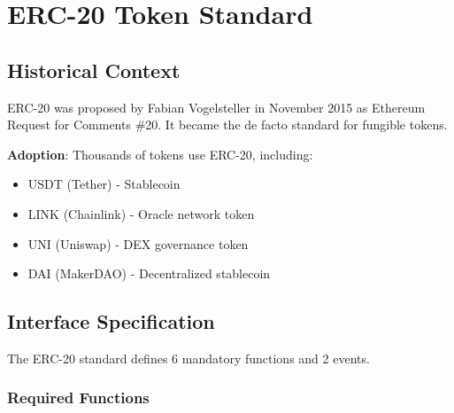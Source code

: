 \documentclass[11pt,a4paper]{article}
\begin{document}
\section{ERC-20 Token Standard}

\subsection{Historical Context}

ERC-20 was proposed by Fabian Vogelsteller in November 2015 as Ethereum Request for Comments \#20. It became the de facto standard for fungible tokens.

\textbf{Adoption}: Thousands of tokens use ERC-20, including:
\begin{itemize}
  \item USDT (Tether) - Stablecoin
  \item LINK (Chainlink) - Oracle network token
  \item UNI (Uniswap) - DEX governance token
  \item DAI (MakerDAO) - Decentralized stablecoin
\end{itemize}

\subsection{Interface Specification}

The ERC-20 standard defines 6 mandatory functions and 2 events.

\subsubsection{Required Functions}
\end{document}

